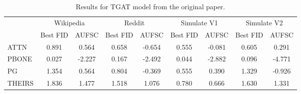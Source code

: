 \begin{table}
\centering
\begin{tabular}{lcccccccc}
\toprule
 & \multicolumn{2}{c}{Wikipedia} & \multicolumn{2}{c}{Reddit} & \multicolumn{2}{c}{Simulate V1} & \multicolumn{2}{c}{Simulate V2} \\
 & Best FID & AUFSC & Best FID & AUFSC & Best FID & AUFSC & Best FID & AUFSC \\
\midrule
ATTN & 0.891 & 0.564 & 0.658 & -0.654 & 0.555 & -0.081 & 0.605 & 0.291 \\
PBONE & 0.027 & -2.227 & 0.167 & -2.492 & 0.044 & -2.882 & 0.096 & -4.771 \\
PG & 1.354 & 0.564 & 0.804 & -0.369 & 0.555 & 0.390 & 1.329 & -0.926 \\
THEIRS & 1.836 & 1.477 & 1.518 & 1.076 & 0.780 & 0.666 & 1.630 & 1.331 \\
\bottomrule
\end{tabular}
\caption{\label{tab:tgat_results_og}Results for TGAT model from the original paper.}
\end{table}
